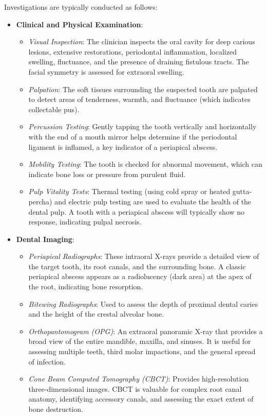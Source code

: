 Investigations are typically conducted as follows:
\begin{itemize}
  \item \textbf{Clinical and Physical Examination}:
    \begin{itemize}
      \item \textit{Visual Inspection}: The clinician inspects the oral cavity for deep carious lesions, extensive restorations, periodontal inflammation, localized swelling, fluctuance, and the presence of draining fistulous tracts. The facial symmetry is assessed for extraoral swelling.
      \item \textit{Palpation}: The soft tissues surrounding the suspected tooth are palpated to detect areas of tenderness, warmth, and fluctuance (which indicates collectable pus).
      \item \textit{Percussion Testing}: Gently tapping the tooth vertically and horizontally with the end of a mouth mirror helps determine if the periodontal ligament is inflamed, a key indicator of a periapical abscess.
      \item \textit{Mobility Testing}: The tooth is checked for abnormal movement, which can indicate bone loss or pressure from purulent fluid.
      \item \textit{Pulp Vitality Tests}: Thermal testing (using cold spray or heated gutta-percha) and electric pulp testing are used to evaluate the health of the dental pulp. A tooth with a periapical abscess will typically show no response, indicating pulpal necrosis.
    \end{itemize}
  \item \textbf{Dental Imaging}:
    \begin{itemize}
      \item \textit{Periapical Radiographs}: These intraoral X-rays provide a detailed view of the target tooth, its root canals, and the surrounding bone. A classic periapical abscess appears as a radiolucency (dark area) at the apex of the root, indicating bone resorption.
      \item \textit{Bitewing Radiographs}: Used to assess the depth of proximal dental caries and the height of the crestal alveolar bone.
      \item \textit{Orthopantomogram (OPG)}: An extraoral panoramic X-ray that provides a broad view of the entire mandible, maxilla, and sinuses. It is useful for assessing multiple teeth, third molar impactions, and the general spread of infection.
      \item \textit{Cone Beam Computed Tomography (CBCT)}: Provides high-resolution three-dimensional images. CBCT is valuable for complex root canal anatomy, identifying accessory canals, and assessing the exact extent of bone destruction.

\end{itemize}
\end{itemize}
